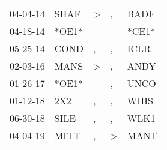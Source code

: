 \begin{supertabular}{lllll}
 04-04-14 &   SHAF &  \textgreater &             , &   BADF \\
 04-18-14 &  *OE1* &               &               &  *CE1* \\
 05-25-14 &   COND &             , &             , &   ICLR \\
 02-03-16 &   MANS &  \textgreater &             , &   ANDY \\
 01-26-17 &  *OE1* &               &             , &   UNCO \\
 01-12-18 &    2X2 &             , &             , &   WHIS \\
 06-30-18 &   SILE &             , &             , &   WLK1 \\
 04-04-19 &   MITT &             , &  \textgreater &   MANT \\
\end{supertabular}
